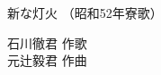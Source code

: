 \documentclass[10pt,b5j]{tarticle} %
\begin{document}
\begin{minipage}[c]{0.7\hsize} %
    \begin{center}
        {\LARGE
            新な灯火 %
        }
        {\small 
            （昭和52年寮歌） %
        }
    \end{center}
\end{minipage}
\begin{minipage}[c]{0.3\hsize} %
    \begin{flushright} %
        石川徹君 作歌\\元辻毅君 作曲 %
    \end{flushright}
\end{minipage}
\end{document}
